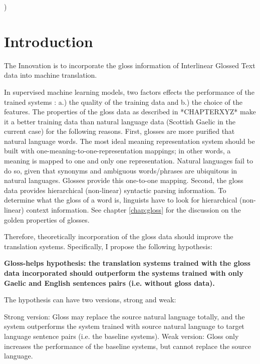 \documentclass[final]{ua-thesis}
\numberwithin{equation}{section}
\begin{document}
               
)


\section{Introduction}
The Innovation is to incorporate the gloss information of Interlinear Glossed Text data into machine translation.

In supervised machine learning models, two factors effects the performance of the trained systems \citep{kotsiantis2007supervised}: a.) the quality of the training data and b.) the choice of the features. The properties of the gloss data as described in *CHAPTERXYZ* make it a better training data than natural language data (Scottish Gaelic in the current case) for the following reasons. First, glosses are more purified that natural language words. The most ideal meaning representation system should be built with one-meaning-to-one-representation mappings; in other words, a meaning is mapped to one and only one representation. Natural languages fail to do so, given that synonyms and ambiguous words/phrases are ubiquitous in natural languages. Glosses provide this one-to-one mapping. Second, the gloss data provides hierarchical (non-linear) syntactic parsing information. To determine what the gloss of a word is, linguists have to look for hierarchical (non-linear) context information. See chapter \ref{chap:gloss} for the discussion on the golden properties of glosses.  

Therefore, theoretically incorporation of the gloss data should improve the translation systems. Specifically, I propose the following hypothesis:
\begin{exe} 
\ex \textbf{Gloss-helps hypothesis: the translation systems trained with the gloss data incorporated should outperform the systems trained with only Gaelic and English sentences pairs (i.e. without gloss data).}

The hypothesis can have two versions, strong and weak:
	\begin{xlist}
	\ex \label{strong_hy} Strong version: Gloss may replace the source natural language totally, and the system outperforms the system trained with source natural language to target language sentence pairs (i.e. the baseline systems).  
	\ex \label{weak_hy} Weak version: Gloss only increases the performance of the baseline systems, but cannot replace the source language.
	\end{xlist}
\end{exe}
\end{document}
